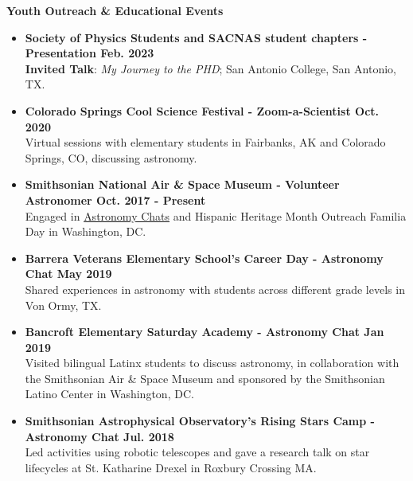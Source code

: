 \documentclass[letter,12pt]{article}
\begin{document}
\noindent
\vspace{-3mm}
{\bf Youth Outreach \& Educational Events} \\
\vspace{-10mm}
\begin{center}
\end{center}
\vspace{-3mm}
\begin{itemize}
    \item \textbf{Society of Physics Students and SACNAS student chapters - Presentation \hfill Feb. 2023} \\
    \textbf{Invited Talk}: \textit{My Journey to the PHD}; San Antonio College, San Antonio, TX.
    \item \textbf{Colorado Springs Cool Science Festival - Zoom-a-Scientist \hfill Oct. 2020} \\
    Virtual sessions with elementary students in Fairbanks, AK and Colorado Springs, CO, discussing astronomy.
    \item \textbf{Smithsonian National Air \& Space Museum - Volunteer Astronomer \hfill Oct. 2017 - Present} \\
    Engaged in \href{https://airandspace.si.edu/events/astronomy-chat-gabriella-alvarez-and-laura-vega-0}{Astronomy Chats} and Hispanic Heritage Month Outreach Familia Day in Washington, DC.
    \item \textbf{Barrera Veterans Elementary School's Career Day - Astronomy Chat \hfill May 2019} \\
    Shared experiences in astronomy with students across different grade levels in Von Ormy, TX.
    \item \textbf{Bancroft Elementary Saturday Academy - Astronomy Chat \hfill Jan 2019} \\
    Visited bilingual Latinx students to discuss astronomy, in collaboration with the Smithsonian Air \& Space Museum and sponsored by the Smithsonian Latino Center in Washington, DC.
    \item \textbf{Smithsonian Astrophysical Observatory's Rising Stars Camp - Astronomy Chat  \hfill Jul. 2018} \\
    Led activities using robotic telescopes and gave a research talk on star lifecycles at St. Katharine Drexel in Roxbury Crossing MA.
\end{itemize}
\end{document}
